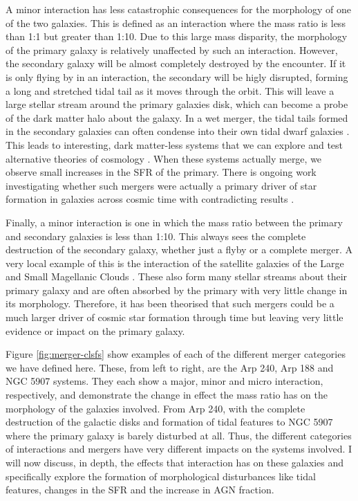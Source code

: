 A minor interaction has less catastrophic consequences for the morphology of one of the two galaxies. This is defined as an interaction where the mass ratio is less than 1:1 but greater than 1:10. Due to this large mass disparity, the morphology of the primary galaxy is relatively unaffected by such an interaction. However, the secondary galaxy will be almost completely destroyed by the encounter. If it is only flying by in an interaction, the secondary will be higly disrupted, forming a long and stretched tidal tail as it moves through the orbit. This will leave a large stellar stream around the primary galaxies disk, which can become a probe of the dark matter halo about the galaxy. In a wet merger, the tidal tails formed in the secondary galaxies can often condense into their own tidal dwarf galaxies \citep{Papers on tidal dwarfs}. This leads to interesting, dark matter-less systems that we can explore and test alternative theories of cosmology \citep{Papers on MOND and that sort of thing}. When these systems actually merge, we observe small increases in the SFR of the primary. There is ongoing work investigating whether such mergers were actually a primary driver of star formation in galaxies across cosmic time \citep{Sugata's paper on the work} with contradicting results \citep{Papers with minor interactions being primary drivers of cosmic SFR}.

Finally, a minor interaction is one in which the mass ratio between the primary and secondary galaxies is less than 1:10. This always sees the complete destruction of the secondary galaxy, whether just a flyby or a complete merger. A very local example of this is the interaction of the satellite galaxies of the Large and Small Magellanic Clouds \citep{Papers that say the LMC and SMC are examples of micro mergers}. These also form many stellar streams about their primary galaxy and are often absorbed by the primary with very little change in its morphology. Therefore, it has been theorised that such mergers could be a much larger driver of cosmic star formation through time but leaving very little evidence or impact on the primary galaxy. 

Figure \ref{fig:merger-clsfs} show examples of each of the different merger categories we have defined here. These, from left to right, are the Arp 240, Arp 188 and NGC 5907 systems. They each show a major, minor and micro interaction, respectively, and demonstrate the change in effect the mass ratio has on the morphology of the galaxies involved. From Arp 240, with the complete destruction of the galactic disks and formation of tidal features to NGC 5907 where the primary galaxy is barely disturbed at all. Thus, the different categories of interactions and mergers have very different impacts on the systems involved. I will now discuss, in depth, the effects that interaction has on these galaxies and specifically explore the formation of morphological disturbances like tidal features, changes in the SFR and the increase in AGN fraction.

